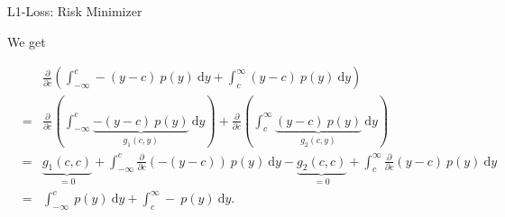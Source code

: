 \documentclass[11pt,compress,t,notes=noshow, xcolor=table]{beamer}
\begin{document}
\begin{vbframe}{L1-Loss: Risk Minimizer}
\begin{footnotesize}
We get 

\vspace*{-0.3cm}

\begin{eqnarray*}
&&\frac{\partial}{\partial c} \left(\int_{-\infty}^c -(y - c)~p(y)~\text{d}y + \int_c^\infty (y - c)~p(y)~\text{d}y \right) \\
&=& \frac{\partial}{\partial c} \left(\int_{-\infty}^c \underbrace{-(y - c)~p(y)}_{g_1(c, y)}~\text{d}y\right) + \frac{\partial}{\partial c} \left(\int_c^\infty \underbrace{(y - c)~p(y)}_{g_2(c, y)}~\text{d}y \right) \\
&=& \underbrace{g_1(c, c)}_{=0} + \int_{-\infty}^c \frac{\partial}{\partial c}  \left(-(y - c)\right)~p(y)~\text{d}y - \underbrace{g_2(c, c)}_{= 0} + \int_c^\infty \frac{\partial}{\partial c}  (y - c)~p(y)~\text{d}y \\
&=& \int_{-\infty}^c  ~p(y)~\text{d}y + \int_c^\infty -~p(y)~\text{d}y. 
\end{eqnarray*}

\end{footnotesize}

\end{vbframe}
\end{document}
